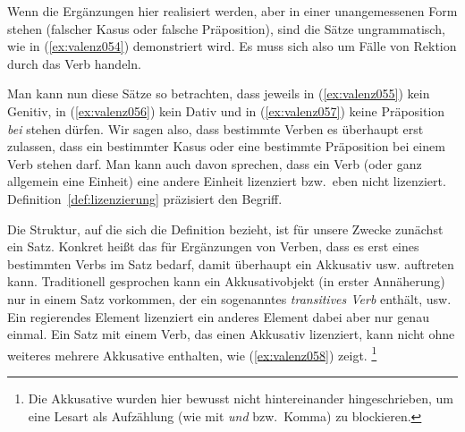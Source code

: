 \begin{exe}
  \ex\label{ex:valenz050}
  \begin{xlist}
  \end{xlist}
\end{exe}

Wenn die Ergänzungen hier realisiert werden, aber in einer unangemessenen Form stehen (falscher Kasus oder falsche Präposition), sind die Sätze ungrammatisch, wie in (\ref{ex:valenz054}) demonstriert wird.
Es muss sich also um Fälle von Rektion durch das Verb handeln.

\begin{exe}
  \ex\label{ex:valenz054}
  \begin{xlist}
  \end{xlist}
\end{exe}

Man kann nun diese Sätze so betrachten, dass jeweils in (\ref{ex:valenz055}) kein Genitiv, in (\ref{ex:valenz056}) kein Dativ und in (\ref{ex:valenz057}) keine Präposition \textit{bei} stehen dürfen.
Wir sagen also, dass bestimmte Verben es überhaupt erst zulassen, dass ein bestimmter Kasus oder eine bestimmte Präposition bei einem Verb stehen darf.
Man kann auch davon sprechen, dass ein Verb (oder ganz allgemein eine Einheit) eine andere Einheit lizenziert bzw.\ eben nicht lizenziert.
Definition~\ref{def:lizenzierung} präzisiert den Begriff.



Die Struktur, auf die sich die Definition bezieht, ist für unsere Zwecke zunächst ein Satz.
Konkret heißt das \zB für Ergänzungen von Verben, dass es erst eines bestimmten Verbs im Satz bedarf, damit überhaupt ein Akkusativ usw. auftreten kann.
Traditionell gesprochen kann ein Akkusativobjekt (in erster Annäherung) nur in einem Satz vorkommen, der ein sogenanntes \textit{transitives Verb} enthält, usw.
Ein regierendes Element lizenziert ein anderes Element dabei aber nur genau einmal.
Ein Satz mit einem Verb, das einen Akkusativ lizenziert, kann nicht ohne weiteres mehrere Akkusative enthalten, wie (\ref{ex:valenz058}) zeigt.%
\footnote{Die Akkusative wurden hier bewusst nicht hintereinander hingeschrieben, um eine Lesart als Aufzählung (wie mit \textit{und} bzw.\ Komma) zu blockieren.}

